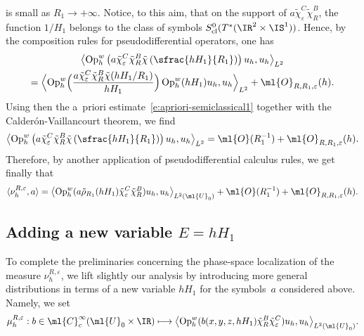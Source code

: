 \documentclass[JEP,XML,SOM,Unicode, NoEqCountersInSection,published]{cedram}
\newcommand\mto{\mathchoice{\longmapsto}{\mapsto}{\mapsto}{\mapsto}}
\theoremstyle{plain}
\theoremstyle{definition}
\theoremstyle{remark}
\newcommand{\Op}{\operatorname{Op}}
\begin{document}
is small as $R_1\to +\infty$. Notice, to this aim, that on the support of $a\tilde{\chi}_\varepsilon^C\tilde{\chi}_R^B$, the function $1/H_1$ belongs to the class of symbols $S^0_{\textup{cl}}(T^*(\IR^2\times\IS^1))$. Hence, by the composition rules for pseudodifferential operators, one has
\begin{multline*}
\left\langle \Op_h^w\left(a\tilde{\chi}_\varepsilon^C\tilde{\chi}_R^B\tilde{\chi}\left(\sfrac{hH_1}{R_1}\right)\right)u_h,u_h\right\rangle_{L^2}\\
=\Bigl\langle \Op_h^w\Bigl(\frac{a\tilde{\chi}_\varepsilon^C\tilde{\chi}_R^B\tilde{\chi}(hH_1/R_1)}{hH_1}\Bigr)\Op_h^w(hH_1)u_h,u_h\Bigr\rangle_{L^2}+\ml{O}_{R,R_1,\varepsilon}(h).
\end{multline*}
Using then the a~priori estimate~\eqref{e:apriori-semiclassical1} together with the Calderón-Vaillancourt theorem, we find
\[
\left\langle\Op_h^w\left(a\tilde{\chi}_\varepsilon^C\tilde{\chi}_R^B\tilde{\chi}\left(\sfrac{hH_1}{R_1}\right)\right)u_h,u_h\right\rangle_{L^2}
=\ml{O}(R_1^{-1})+\ml{O}_{R,R_1,\varepsilon}(h).
\]
Therefore, by another application of pseudodifferential calculus rules, we get finally that
\begin{equation}\label{e:measure-pseudo4}
\langle\nu_h^{R,\varepsilon},a\rangle=\left\langle \Op_h^w(a\tilde{\rho}_{R_1}(hH_1)\tilde{\chi}_\varepsilon^C\tilde{\chi}_R^B)u_h,u_h\right\rangle_{L^2(\ml{U}_0)}+\ml{O}(R_1^{-1})+\ml{O}_{R,R_1,\varepsilon}(h).
\end{equation}

\subsection{Adding a new variable $E=hH_1$}\label{s:new_variable}
To complete the preliminaries concerning the phase-space localization of the measure $\nu_h^{R,\varepsilon}$, we lift slightly our analysis by intro\-ducing more general distributions in terms of a new variable $h H_1$ for the symbols~$a$ considered above. Namely, we set
\begin{equation}\label{e:wigner-H1}\mu_{h}^{R,\varepsilon}: b\in\ml{C}_c^{\infty}(\ml{U}_0\times\IR)\mto\bigl\langle \Op_h^w(b(x,y,z,hH_1)\tilde{\chi}_R^B\tilde{\chi}_\varepsilon^C)u_h,u_h\bigr\rangle_{L^2(\ml{U}_0)}.\end{equation}
\end{document}
